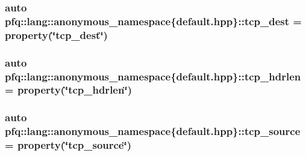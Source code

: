 \hypertarget{namespacepfq_1_1lang_1_1anonymous__namespace_02default_8hpp_03_a83741c074712431d2e75f09744bb7486}{
\subsubsection[{tcp\+\_\+dest}]{\setlength{\rightskip}{0pt plus 5cm}auto pfq\+::lang\+::anonymous\+\_\+namespace\{default.\+hpp\}\+::tcp\+\_\+dest = {\bf property}(\char`\"{}tcp\+\_\+dest\char`\"{})}}\label{namespacepfq_1_1lang_1_1anonymous__namespace_02default_8hpp_03_a83741c074712431d2e75f09744bb7486}
\hypertarget{namespacepfq_1_1lang_1_1anonymous__namespace_02default_8hpp_03_a678163384b58e4682bdbaf7efdd22cfb}{
\subsubsection[{tcp\+\_\+hdrlen}]{\setlength{\rightskip}{0pt plus 5cm}auto pfq\+::lang\+::anonymous\+\_\+namespace\{default.\+hpp\}\+::tcp\+\_\+hdrlen = {\bf property}(\char`\"{}tcp\+\_\+hdrlen\char`\"{})}}\label{namespacepfq_1_1lang_1_1anonymous__namespace_02default_8hpp_03_a678163384b58e4682bdbaf7efdd22cfb}
\hypertarget{namespacepfq_1_1lang_1_1anonymous__namespace_02default_8hpp_03_a367a9ec6d91677553073c54a059b391d}{
\subsubsection[{tcp\+\_\+source}]{\setlength{\rightskip}{0pt plus 5cm}auto pfq\+::lang\+::anonymous\+\_\+namespace\{default.\+hpp\}\+::tcp\+\_\+source = {\bf property}(\char`\"{}tcp\+\_\+source\char`\"{})}}\label{namespacepfq_1_1lang_1_1anonymous__namespace_02default_8hpp_03_a367a9ec6d91677553073c54a059b391d}
